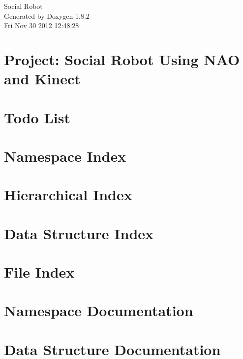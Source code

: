 \documentclass{book}
\begin{document}
\hypersetup{pageanchor=false,citecolor=blue}
\begin{titlepage}
\vspace*{7cm}
\begin{center}
{\Large Social Robot }\\
\vspace*{1cm}
{\large Generated by Doxygen 1.8.2}\\
\vspace*{0.5cm}
{\small Fri Nov 30 2012 12:48:28}\\
\end{center}
\end{titlepage}
\clearemptydoublepage
{}
\tableofcontents
\clearemptydoublepage
{}
\hypersetup{pageanchor=true,citecolor=blue}
\chapter{Project\-: Social Robot Using N\-A\-O and Kinect}
\label{index}\hypertarget{index}{}
\chapter{Todo List}
\label{todo}
\hypertarget{todo}{}

\chapter{Namespace Index}

\chapter{Hierarchical Index}

\chapter{Data Structure Index}

\chapter{File Index}

\chapter{Namespace Documentation}



\chapter{Data Structure Documentation}

























\end{document}
